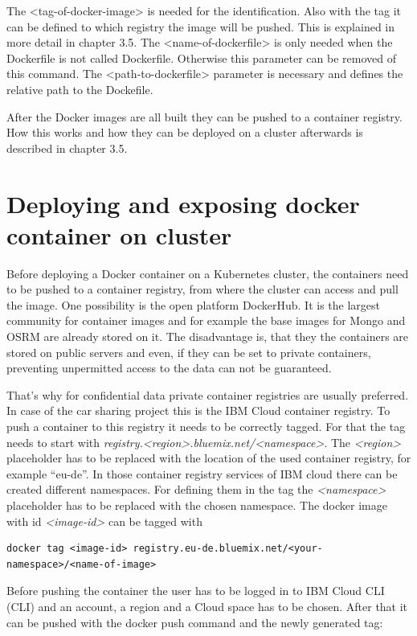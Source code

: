 The <tag-of-docker-image> is needed for the identification. Also with the tag it can be defined to which registry the image will be pushed. This is explained in more detail in chapter 3.5. The <name-of-dockerfile> is only needed when the Dockerfile is not called Dockerfile. Otherwise this parameter can be removed of this command. The <path-to-dockerfile> parameter is necessary and defines the relative path to the Dockefile. 

After the Docker images are all built they can be pushed to a container registry. How this works and how they can be deployed on a cluster afterwards is described in chapter 3.5.


\section{Deploying and exposing docker container on cluster}

Before deploying a Docker container on a Kubernetes cluster, the containers need to be pushed to a container registry, from where the cluster can access and pull the image. One possibility is the open platform DockerHub. It is the largest community for container images and for example the base images for Mongo and OSRM are already stored on it. The disadvantage is, that they the containers are stored on public servers and even, if they can be set to private containers, preventing unpermitted access to the data can not be guaranteed. 

That's why for confidential data private container registries are usually preferred. In case of the car sharing project this is the IBM Cloud container registry. To push a container to this registry it needs to be correctly tagged. For that the tag needs to start with \textit{registry.<region>.bluemix.net/<namespace>}. The \textit{<region>} placeholder has to be replaced with the location of the used container registry, for example ``eu-de''. In those container registry services of IBM cloud there can be created different namespaces. For defining them in the tag the \textit{<namespace>} placeholder has to be replaced with the chosen namespace. The docker image with id \textit{<image-id>} can be tagged with

\begin{lstlisting}
docker tag <image-id> registry.eu-de.bluemix.net/<your-namespace>/<name-of-image>
\end{lstlisting}

Before pushing the container the user has to be logged in to IBM Cloud \acs{CLI} (\acl{CLI}) and an account, a region and a Cloud space has to be chosen. After that it can be pushed with the docker push command and the newly generated tag:


